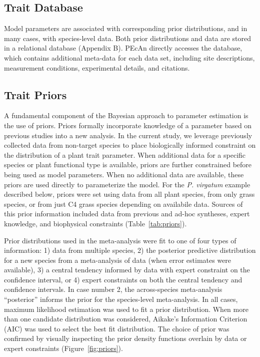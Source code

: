 \documentclass[12pt]{article}
\begin{document}
\begin{flushleft}
\begin{spacing}{1.9}
\subsection*{Trait Database}
 
 Model parameters are associated with corresponding prior distributions, and in many cases, with species-level data.
 Both prior distributions and data are stored in a relational database (Appendix B).
 PEcAn directly accesses the database, which contains additional meta-data for each data set, including site descriptions, measurement conditions, experimental details, and citations.

\subsection*{Trait Priors}

 A fundamental component of the Bayesian approach to parameter estimation is the use of priors. 
 Priors formally incorporate knowledge of a parameter based on previous studies into a new analysis.
 In the current study, we leverage previously collected data from non-target species to place biologically informed constraint on the distribution of a plant trait parameter.
 When additional data for a specific species or plant functional type is available, priors are further constrained before being used as model parameters.
 When no additional data are available, these priors are used directly to parameterize the model.
 For the \emph{P. virgatum} example described below, priors were set using data from all plant species, from only grass species, or from just C4 grass species depending on availabile data.
 Sources of this prior information included data from previous and ad-hoc syntheses, expert knowledge, and biophysical constraints (Table~\ref{tab:priors}).
  
 Prior distributions used in the meta-analysis were fit to one of four types of information: 1) data from multiple species, 2) the posterior predictive distribution for a new species from a meta-analysis of data (when error estimates were available), 3) a central tendency informed by data with expert constraint on the confidence interval, or 4) expert constraints on both the central tendency and confidence intervals.
 In case number 2, the across-species meta-analysis ``posterior'' informs the prior for the species-level meta-analysis.
 In all cases, maximum likelihood estimation was used to fit a prior distribution.
 When more than one candidate distribution was considered, Aikake's Information Criterion (AIC) was used to select the best fit distribution. 
 The choice of prior was confirmed by visually inspecting the prior density functions overlain by data or expert constraints (Figure~\ref{fig:priors}).
 

\end{spacing}
\end{flushleft}
\end{document}
